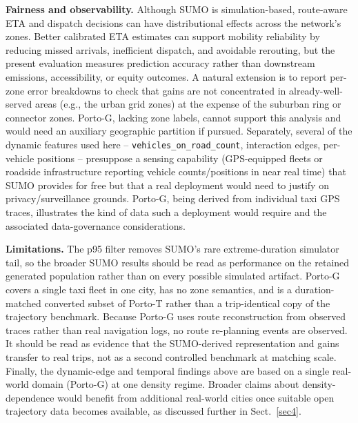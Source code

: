 \documentclass[pdflatex,sn-basic,Numbered]{sn-jnl}%
\begin{document}
\textbf{Fairness and observability.} Although SUMO is simulation-based, route-aware ETA and dispatch decisions can have distributional effects across the network's zones. Better calibrated ETA estimates can support mobility reliability by reducing missed arrivals, inefficient dispatch, and avoidable rerouting, but the present evaluation measures prediction accuracy rather than downstream emissions, accessibility, or equity outcomes. A natural extension is to report per-zone error breakdowns to check that gains are not concentrated in already-well-served areas (e.g., the urban grid zones) at the expense of the suburban ring or connector zones. Porto-G, lacking zone labels, cannot support this analysis and would need an auxiliary geographic partition if pursued. Separately, several of the dynamic features used here -- \texttt{vehicles\_on\_road\_count}, interaction edges, per-vehicle positions -- presuppose a sensing capability (GPS-equipped fleets or roadside infrastructure reporting vehicle counts/positions in near real time) that SUMO provides for free but that a real deployment would need to justify on privacy/surveillance grounds. Porto-G, being derived from individual taxi GPS traces, illustrates the kind of data such a deployment would require and the associated data-governance considerations.

\textbf{Limitations.} The p95 filter removes SUMO's rare extreme-duration simulator tail, so the broader SUMO results should be read as performance on the retained generated population rather than on every possible simulated artifact. Porto-G covers a single taxi fleet in one city, has no zone semantics, and is a duration-matched converted subset of Porto-T rather than a trip-identical copy of the trajectory benchmark. Because Porto-G uses route reconstruction from observed traces rather than real navigation logs, no route re-planning events are observed. It should be read as evidence that the SUMO-derived representation and gains transfer to real trips, not as a second controlled benchmark at matching scale. Finally, the dynamic-edge and temporal findings above are based on a single real-world domain (Porto-G) at one density regime. Broader claims about density-dependence would benefit from additional real-world cities once suitable open trajectory data becomes available, as discussed further in Sect.~\ref{sec4}.




\end{document}

